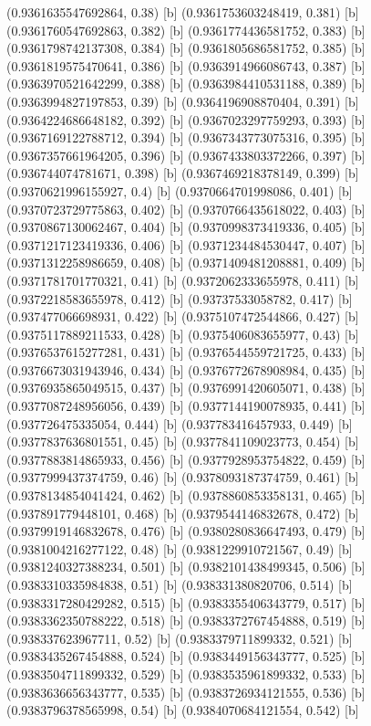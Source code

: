 {{{(0.9361635547692864, 0.38) [b] 
(0.9361753603248419, 0.381) [b] 
(0.9361760547692863, 0.382) [b] 
(0.9361774436581752, 0.383) [b] 
(0.9361798742137308, 0.384) [b] 
(0.9361805686581752, 0.385) [b] 
(0.9361819575470641, 0.386) [b] 
(0.9363914966086743, 0.387) [b] 
(0.9363970521642299, 0.388) [b] 
(0.9363984410531188, 0.389) [b] 
(0.9363994827197853, 0.39) [b] 
(0.9364196908870404, 0.391) [b] 
(0.9364224686648182, 0.392) [b] 
(0.9367023297759293, 0.393) [b] 
(0.9367169122788712, 0.394) [b] 
(0.9367343773075316, 0.395) [b] 
(0.9367357661964205, 0.396) [b] 
(0.9367433803372266, 0.397) [b] 
(0.936744074781671, 0.398) [b] 
(0.9367469218378149, 0.399) [b] 
(0.9370621996155927, 0.4) [b] 
(0.9370664701998086, 0.401) [b] 
(0.9370723729775863, 0.402) [b] 
(0.9370766435618022, 0.403) [b] 
(0.9370867130062467, 0.404) [b] 
(0.9370998373419336, 0.405) [b] 
(0.9371217123419336, 0.406) [b] 
(0.9371234484530447, 0.407) [b] 
(0.9371312258986659, 0.408) [b] 
(0.9371409481208881, 0.409) [b] 
(0.9371781701770321, 0.41) [b] 
(0.9372062333655978, 0.411) [b] 
(0.9372218583655978, 0.412) [b] 
(0.93737533058782, 0.417) [b] 
(0.937477066698931, 0.422) [b] 
(0.9375107472544866, 0.427) [b] 
(0.9375117889211533, 0.428) [b] 
(0.9375406083655977, 0.43) [b] 
(0.9376537615277281, 0.431) [b] 
(0.9376544559721725, 0.433) [b] 
(0.9376673031943946, 0.434) [b] 
(0.9376772678908984, 0.435) [b] 
(0.9376935865049515, 0.437) [b] 
(0.9376991420605071, 0.438) [b] 
(0.9377087248956056, 0.439) [b] 
(0.9377144190078935, 0.441) [b] 
(0.937726475335054, 0.444) [b] 
(0.937783416457933, 0.449) [b] 
(0.9377837636801551, 0.45) [b] 
(0.9377841109023773, 0.454) [b] 
(0.9377883814865933, 0.456) [b] 
(0.9377928953754822, 0.459) [b] 
(0.9377999437374759, 0.46) [b] 
(0.9378093187374759, 0.461) [b] 
(0.9378134854041424, 0.462) [b] 
(0.9378860853358131, 0.465) [b] 
(0.937891779448101, 0.468) [b] 
(0.9379544146832678, 0.472) [b] 
(0.9379919146832678, 0.476) [b] 
(0.9380280836647493, 0.479) [b] 
(0.9381004216277122, 0.48) [b] 
(0.9381229910721567, 0.49) [b] 
(0.9381240327388234, 0.501) [b] 
(0.9382101438499345, 0.506) [b] 
(0.9383310335984838, 0.51) [b] 
(0.938331380820706, 0.514) [b] 
(0.9383317280429282, 0.515) [b] 
(0.9383355406343779, 0.517) [b] 
(0.9383362350788222, 0.518) [b] 
(0.9383372767454888, 0.519) [b] 
(0.938337623967711, 0.52) [b] 
(0.9383379711899332, 0.521) [b] 
(0.9383435267454888, 0.524) [b] 
(0.9383449156343777, 0.525) [b] 
(0.9383504711899332, 0.529) [b] 
(0.9383535961899332, 0.533) [b] 
(0.9383636656343777, 0.535) [b] 
(0.9383726934121555, 0.536) [b] 
(0.9383796378565998, 0.54) [b] 
(0.9384070684121554, 0.542) [b] 
}}}
